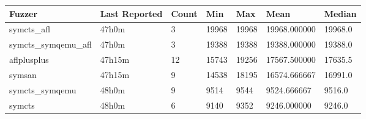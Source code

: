 
\begin{table*}[h]
\centering
\begin{tabular}{|l|l|l|l|l|l|l|}
\hline
\textbf{Fuzzer} & \textbf{Last Reported} & \textbf{Count} & \textbf{Min} & \textbf{Max} & \textbf{Mean} & \textbf{Median} \\
\hline
symcts\_afl        & 47h0m              & 3      & 19968 & 19968 & 19968.000000  & 19968.0    \\
symcts\_symqemu\_afl & 47h0m              & 3      & 19388 & 19388 & 19388.000000  & 19388.0    \\
aflplusplus        & 47h15m             & 12     & 15743 & 19256 & 17567.500000  & 17635.5    \\
symsan             & 47h15m             & 9      & 14538 & 18195 & 16574.666667  & 16991.0    \\
symcts\_symqemu    & 48h0m              & 9      & 9514  & 9544  & 9524.666667   & 9516.0     \\
symcts             & 48h0m              & 6      & 9140  & 9352  & 9246.000000   & 9246.0     \\
\hline
\end{tabular}
\end{table*}
